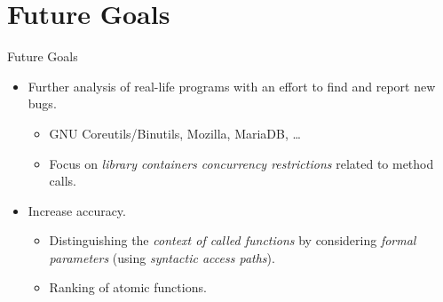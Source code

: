\documentclass[10pt, hyperref={unicode}, aspectratio=169]{beamer}
\begin{document}
\section{Future Goals}
\begin{frame}{Future Goals}
    \begin{itemize}\setlength\itemsep{3em}
        \item
            Further analysis of \alert{real-life programs} with
            an effort to find and report \alert{new bugs}.
            
            \smallskip

            \begin{itemize}\setlength\itemsep{1em}
                \item
                    GNU Coreutils/Binutils, Mozilla, MariaDB, \ldots

                \item
                    Focus on \emph{library containers concurrency
                    restrictions} related to method calls.
            \end{itemize}

        \item
            Increase \alert{accuracy}.
            
            \smallskip
            
            \begin{itemize}\setlength\itemsep{1em}
                \item
                    Distinguishing the \emph{context of called
                    functions} by considering \emph{formal parameters}
                    (using \emph{syntactic access paths}).

                \item
                    \alert{Ranking} of atomic functions.
            \end{itemize}
    \end{itemize}
\end{frame}
\end{document}
